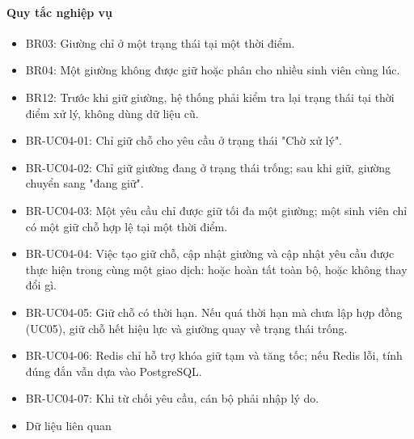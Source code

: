 \paragraph{Quy tắc nghiệp vụ}

\begin{itemize}[leftmargin=1.4em]
\item BR03: Giường chỉ ở một trạng thái tại một thời điểm.
\item BR04: Một giường không được giữ hoặc phân cho nhiều sinh viên cùng lúc.
\item BR12: Trước khi giữ giường, hệ thống phải kiểm tra lại trạng thái tại thời điểm xử lý, không dùng dữ liệu cũ.
\item BR-UC04-01: Chỉ giữ chỗ cho yêu cầu ở trạng thái "Chờ xử lý".
\item BR-UC04-02: Chỉ giữ giường đang ở trạng thái trống; sau khi giữ, giường chuyển sang "đang giữ".
\item BR-UC04-03: Một yêu cầu chỉ được giữ tối đa một giường; một sinh viên chỉ có một giữ chỗ hợp lệ tại một thời điểm.
\item BR-UC04-04: Việc tạo giữ chỗ, cập nhật giường và cập nhật yêu cầu được thực hiện trong cùng một giao dịch: hoặc hoàn tất toàn bộ, hoặc không thay đổi gì.
\item BR-UC04-05: Giữ chỗ có thời hạn. Nếu quá thời hạn mà chưa lập hợp đồng (UC05), giữ chỗ hết hiệu lực và giường quay về trạng thái trống.
\item BR-UC04-06: Redis chỉ hỗ trợ khóa giữ tạm và tăng tốc; nếu Redis lỗi, tính đúng đắn vẫn dựa vào PostgreSQL.
\item BR-UC04-07: Khi từ chối yêu cầu, cán bộ phải nhập lý do.
\item Dữ liệu liên quan
\end{itemize}

